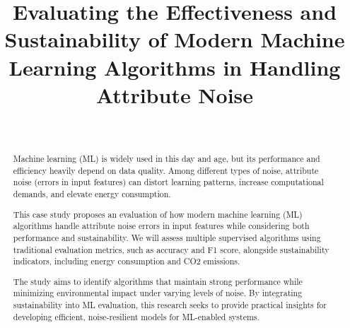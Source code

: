 \documentclass[conference]{IEEEtran}
\begin{document}
\title{Evaluating the Effectiveness and Sustainability of Modern Machine Learning Algorithms in Handling Attribute Noise}

\author{
 \\
}

\maketitle

\begin{abstract}
Machine learning (ML) is widely used in this day and age, but its performance and efficiency heavily depend on data quality. Among different types of noise, attribute noise (errors in input features) can distort learning patterns, increase computational demands, and elevate energy consumption.

This case study proposes an evaluation of how modern machine learning (ML) algorithms handle attribute noise errors in input features while considering both performance and sustainability. We will assess multiple supervised algorithms using traditional evaluation metrics, such as accuracy and F1 score, alongside sustainability indicators, including energy consumption and CO2 emissions.
    
The study aims to identify algorithms that maintain strong performance while minimizing environmental impact under varying levels of noise. By integrating sustainability into ML evaluation, this research seeks to provide practical insights for developing efficient, noise-resilient models for ML-enabled systems.
\end{abstract}


\end{document}
